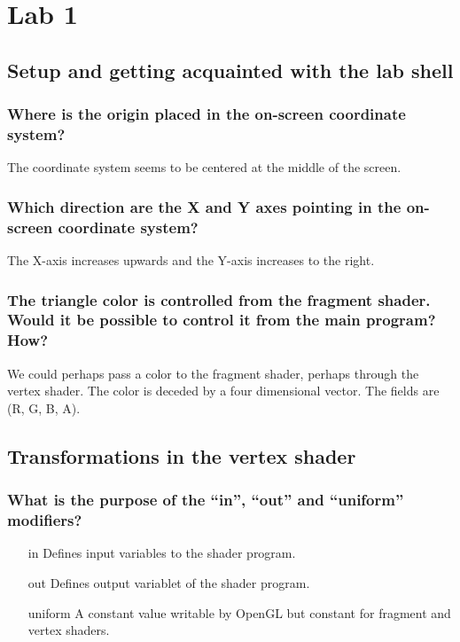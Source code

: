 \documentclass[a4paper,12pt]{article}
\begin{document}
\section{Lab 1}

\subsection{Setup and getting acquainted with the lab shell}
\subsubsection{Where is the origin placed in the on-screen coordinate system?}
The coordinate system seems to be centered at the middle of the screen.

\subsubsection{Which direction are the X and Y axes pointing in the on-screen coordinate system?}
The X-axis increases upwards and the Y-axis increases to the right.

\subsubsection{The triangle color is controlled from the fragment shader. Would it be possible to control it from the main program? How?}
We could perhaps pass a color to the fragment shader, perhaps through the vertex shader. The color is deceded by a four dimensional vector. The fields are (R, G, B, A).

\subsection{Transformations in the vertex shader}
\subsubsection{What is the purpose of the ``in'', ``out'' and ``uniform'' modifiers?}
\begin{itemize}
\item[in] Defines input variables to the shader program.
\item[out] Defines output variablet of the shader program.
\item[uniform] A constant value writable by OpenGL but constant for fragment and vertex shaders.
\end{itemize}
\end{document}
